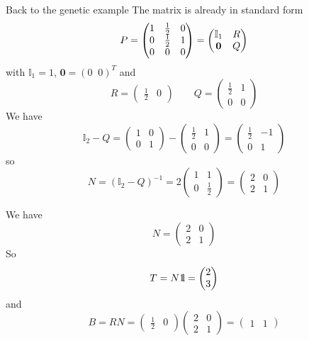 \documentclass[aspectratio=169]{beamer}\usepackage[]{graphicx}\usepackage[]{xcolor}
\begin{document}
\begin{frame}{Back to the genetic example}
The matrix is already in standard form
\[
P=
\begin{pmatrix}
1 & \frac 12 & 0 \\
0 & \frac 12 & 1 \\
0 & 0 & 0
\end{pmatrix}
=\begin{pmatrix}
\mathbb{I}_1 & R \\
\b0 & Q
\end{pmatrix}
\]
with $\mathbb{I}_1=1$, $\mathbf{0}=(0\;\; 0)^T$ and
\[
R=\begin{pmatrix}
\frac 12 & 0
\end{pmatrix}
\qquad
Q=\begin{pmatrix}
\frac 12 & 1\\
0 & 0
\end{pmatrix}
\]
We have
\[
\mathbb{I}_2-Q=\begin{pmatrix}
1 & 0 \\
0 & 1
\end{pmatrix}
-\begin{pmatrix}
\frac 12 & 1\\
0 & 0
\end{pmatrix}
=\begin{pmatrix}
\frac 12 & -1\\
0 & 1
\end{pmatrix}
\]
so
\[
N=(\mathbb{I}_2-Q)^{-1}=
2\begin{pmatrix}
1 & 1 \\
0 & \frac 12
\end{pmatrix}=
\begin{pmatrix}
2 & 0 \\
2 & 1
\end{pmatrix}
\]
\end{frame}


\begin{frame}
We have
\[
N=
\begin{pmatrix}
	2 & 0 \\
	2 & 1
\end{pmatrix}
\]
So
\[
T=N\nbOne=\begin{pmatrix}
2\\
3
\end{pmatrix}
\]
and
\[
B=RN=
\begin{pmatrix}
	\frac 12 & 0
\end{pmatrix}
\begin{pmatrix}
	2 & 0 \\
	2 & 1
\end{pmatrix}
=
\begin{pmatrix}
1 & 1
\end{pmatrix}
\]
\end{frame}
\end{document}
